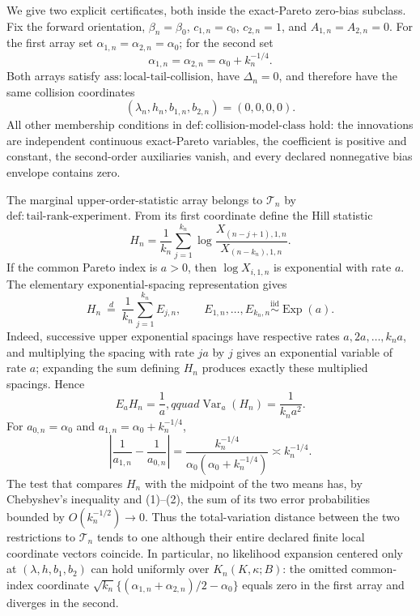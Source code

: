 We give two explicit certificates, both inside the exact-Pareto zero-bias subclass.  Fix the forward orientation, \(\beta_n=\beta_0\), \(c_{1,n}=c_0\), \(c_{2,n}=1\), and \(A_{1,n}=A_{2,n}=0\).  For the first array set
\(\alpha_{1,n}=\alpha_{2,n}=\alpha_0\); for the second set
\[
 \alpha_{1,n}=\alpha_{2,n}=\alpha_0+k_n^{-1/4}.
\]
Both arrays satisfy \(\mathrm{ass{:}local\text{-}tail\text{-}collision}\), have \(\Delta_n=0\), and therefore have the same collision coordinates
\[
 (\lambda_n,h_n,b_{1,n},b_{2,n})=(0,0,0,0).
\]
All other membership conditions in \(\mathrm{def{:}collision\text{-}model\text{-}class}\) hold: the innovations are independent continuous exact-Pareto variables, the coefficient is positive and constant, the second-order auxiliaries vanish, and every declared nonnegative bias envelope contains zero.

The marginal upper-order-statistic array belongs to \(\mathcal T_n\) by \(\mathrm{def{:}tail\text{-}rank\text{-}experiment}\).  From its first coordinate define the Hill statistic
\[
 H_n=\frac1{k_n}\sum_{j=1}^{k_n}
 \log\frac{X_{(n-j+1),1,n}}{X_{(n-k_n),1,n}}.
\]
If the common Pareto index is \(a>0\), then \(\log X_{i,1,n}\) is exponential with rate \(a\).  The elementary exponential-spacing representation gives
\[
 H_n\ \stackrel{d}{=}\ \frac1{k_n}\sum_{j=1}^{k_n}E_{j,n},
 \qquad E_{1,n},\ldots,E_{k_n,n}\overset{\mathrm{iid}}{\sim}\operatorname{Exp}(a).
\]
Indeed, successive upper exponential spacings have respective rates \(a,2a,\ldots,k_na\), and multiplying the spacing with rate \(ja\) by \(j\) gives an exponential variable of rate \(a\); expanding the sum defining \(H_n\) produces exactly these multiplied spacings.  Hence
\[
 E_aH_n=\frac1a,qquad \operatorname{Var}_a(H_n)=\frac1{k_na^2}. \tag{1}
\]
For \(a_{0,n}=\alpha_0\) and \(a_{1,n}=\alpha_0+k_n^{-1/4}\),
\[
 \left|\frac1{a_{1,n}}-\frac1{a_{0,n}}\right|
 =\frac{k_n^{-1/4}}{\alpha_0(\alpha_0+k_n^{-1/4})}
 \asymp k_n^{-1/4}. \tag{2}
\]
The test that compares \(H_n\) with the midpoint of the two means has, by Chebyshev's inequality and (1)--(2), the sum of its two error probabilities bounded by \(O(k_n^{-1/2})\to0\).  Thus the total-variation distance between the two restrictions to \(\mathcal T_n\) tends to one although their entire declared finite local coordinate vectors coincide.  In particular, no likelihood expansion centered only at \((\lambda,h,b_1,b_2)\) can hold uniformly over \(K_n(K,\kappa;B)\): the omitted common-index coordinate
\(\sqrt{k_n}\{(\alpha_{1,n}+\alpha_{2,n})/2-\alpha_0\}\) equals zero in the first array and diverges in the second.

